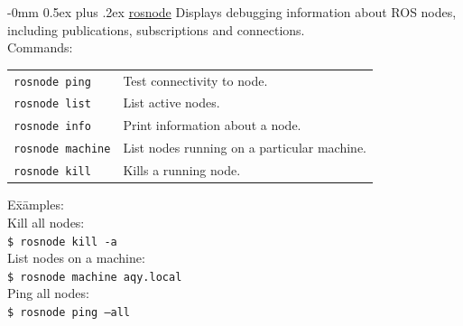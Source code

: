 \documentclass[10pt,landscape]{article}
\makeatletter
\renewcommand{\subsection}{\@startsection{subsection}{2}{0mm}%
                                {-0mm}%
                                {0.5ex plus .2ex}%
                                {\normalfont\normalsize\bfseries}}
\makeatother
\begin{document}
\begin{multicols}{3}
\vspace{-2.5 mm}
\subsection{\href{http://wiki.ros.org/rosnode}{rosnode}}
Displays debugging information about ROS nodes, including publications, subscriptions and connections.\\
\vspace{2.5 mm}
Commands: \\ 
\begin{tabular}{@{}p{\the\MyLen}%
                @{}p{\linewidth-\the\MyLen}@{}}
\texttt{rosnode ping}    & Test connectivity to node. \\
\texttt{rosnode list}    & List active nodes. \\
\texttt{rosnode info}    & Print information about a node. \\
\texttt{rosnode machine} & List nodes running on a particular machine. \\
\texttt{rosnode kill}    & Kills a running node. 
\end{tabular}
\begin{tabbing}
E\=x\=amples:\\
\> Kill all nodes:\\
\> \> \texttt{\$ rosnode kill -a}\\
\> List nodes on a machine:\\
\> \> \texttt{\$ rosnode machine aqy.local}\\
\> Ping all nodes:\\
\> \> \texttt{\$ rosnode ping --all} 
\end{tabbing}


\vspace{-2.5 mm}

\end{multicols}
\end{document}

